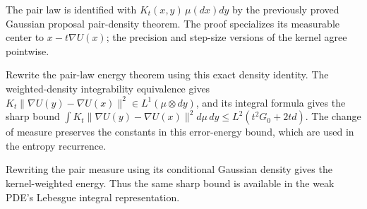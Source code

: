 \documentclass[11pt,a4paper]{article}
\begin{document}
The pair law is identified with \(K_t(x,y)\,\mu(dx)dy\) by the previously proved Gaussian proposal pair-density theorem. The proof specializes its measurable center to \(x-t\nabla U(x)\); the precision and step-size versions of the kernel agree pointwise.



Rewrite the pair-law energy theorem using this exact density identity. The weighted-density integrability equivalence gives \(K_t\|\nabla U(y)-\nabla U(x)\|^2\in L^1(\mu\otimes dy)\), and its integral formula gives the sharp bound \(\int K_t\|\nabla U(y)-\nabla U(x)\|^2d\mu\,dy\le L^2(t^2G_0+2td)\). The change of measure preserves the constants in this error-energy bound, which are used in the entropy recurrence.



Rewriting the pair measure using its conditional Gaussian density gives the kernel-weighted energy. Thus the same sharp bound is available in the weak PDE's Lebesgue integral representation.
\end{document}
